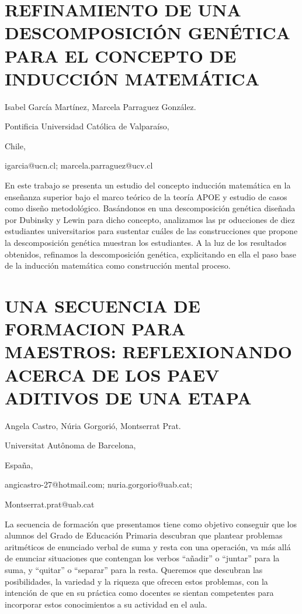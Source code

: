 \section{REFINAMIENTO DE UNA DESCOMPOSICIÓN GENÉTICA PARA EL CONCEPTO DE INDUCCIÓN
MATEMÁTICA}

\begin{datos}

Isabel García Martínez, Marcela Parraguez González.

Pontificia Universidad Católica de Valparaíso,

Chile,

igarcia@ucn.cl; marcela.parraguez@ucv.cl 

\end{datos}

En este trabajo se presenta un estudio del concepto inducción matemática
en la enseñanza superior bajo el marco teórico de la teoría APOE y
estudio de casos como diseño metodológico. Basándonos en una descomposición
genética diseñada por Dubinsky y Lewin para dicho concepto, analizamos
las pr oducciones de diez estudiantes universitarios para sustentar
cuáles de las construcciones que propone la descomposición genética
muestran los estudiantes. A la luz de los resultados obtenidos, refinamos
la descomposición genética, explicitando en ella el paso base de la
inducción matemática como construcción mental proceso.


\section{UNA SECUENCIA DE FORMACION PARA MAESTROS: REFLEXIONANDO ACERCA DE
LOS PAEV ADITIVOS DE UNA ETAPA}

\begin{datos}

Angela Castro, Núria Gorgorió, Montserrat Prat.

Universitat Autônoma de Barcelona,

España,

angicastro-27@hotmail.com; nuria.gorgorio@uab.cat;

Montserrat.prat@uab.cat

\end{datos}

La secuencia de formación que presentamos tiene como objetivo conseguir
que los alumnos del Grado de Educación Primaria descubran que plantear
problemas aritméticos de enunciado verbal de suma y resta con una
operación, va más allá de enunciar situaciones que contengan los verbos
“añadir” o “juntar” para la suma, y “quitar” o “separar” para la resta.
Queremos que descubran las posibilidades, la variedad y la riqueza
que ofrecen estos problemas, con la intención de que en su práctica
como docentes se sientan competentes para incorporar estos conocimientos
a su actividad en el aula.


